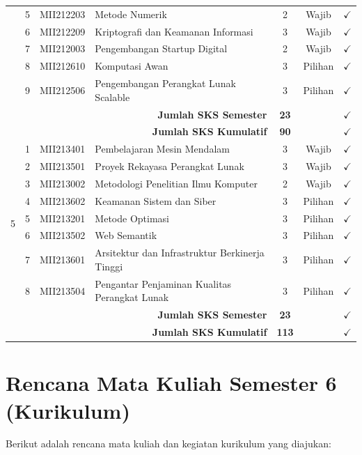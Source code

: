 \documentclass[a4paper,12pt]{article}
\begin{document}
\begin{longtable}{|c|c|l|p{5.5cm}|c|c|c|}
    & 5 & MII212203 & Metode Numerik & 2 & Wajib & $\checkmark$ \\
    & 6 & MII212209 & Kriptografi dan Keamanan Informasi & 3 & Wajib & $\checkmark$ \\
    & 7 & MII212003 & Pengembangan Startup Digital & 2 & Wajib & $\checkmark$ \\
    & 8 & MII212610 & Komputasi Awan & 3 & Pilihan & $\checkmark$ \\
    & 9 & MII212506 & Pengembangan Perangkat Lunak Scalable & 3 & Pilihan & $\checkmark$ \\
    \hline
    \multicolumn{4}{|r|}{\textbf{Jumlah SKS Semester}} & \textbf{23} & & $\checkmark$ \\
    \multicolumn{4}{|r|}{\textbf{Jumlah SKS Kumulatif}} & \textbf{90} & & $\checkmark$ \\
    \hline
    \multirow{8}{*}{5}
    & 1 & MII213401 & Pembelajaran Mesin Mendalam & 3 & Wajib & $\checkmark$ \\
    & 2 & MII213501 & Proyek Rekayasa Perangkat Lunak & 3 & Wajib & $\checkmark$ \\
    & 3 & MII213002 & Metodologi Penelitian Ilmu Komputer & 2 & Wajib & $\checkmark$ \\
    & 4 & MII213602 & Keamanan Sistem dan Siber & 3 & Pilihan & $\checkmark$ \\
    & 5 & MII213201 & Metode Optimasi & 3 & Pilihan & $\checkmark$ \\
    & 6 & MII213502 & Web Semantik & 3 & Pilihan & $\checkmark$ \\
    & 7 & MII213601 & Arsitektur dan Infrastruktur Berkinerja Tinggi & 3 & Pilihan & $\checkmark$ \\
    & 8 & MII213504 & Pengantar Penjaminan Kualitas Perangkat Lunak & 3 & Pilihan & $\checkmark$ \\
    \hline
    \multicolumn{4}{|r|}{\textbf{Jumlah SKS Semester}} & \textbf{23} & & $\checkmark$ \\
    \multicolumn{4}{|r|}{\textbf{Jumlah SKS Kumulatif}} & \textbf{113} & & $\checkmark$ \\
    \hline
\end{longtable}

\clearpage

\section*{Rencana Mata Kuliah Semester 6 (Kurikulum)}

Berikut adalah rencana mata kuliah dan kegiatan kurikulum yang diajukan:
\end{document}
